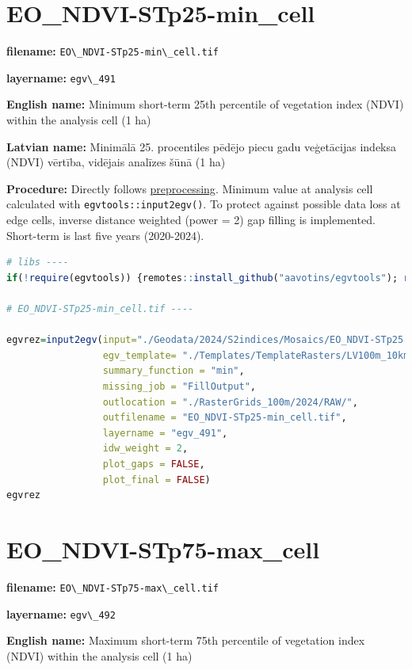 \documentclass[
]{book}
\newcommand{\passthrough}[1]{#1}
\begin{document}
\section{EO\_NDVI-STp25-min\_cell}\label{ch06.491}

\textbf{filename:} \passthrough{\lstinline!EO\_NDVI-STp25-min\_cell.tif!}

\textbf{layername:} \passthrough{\lstinline!egv\_491!}

\textbf{English name:} Minimum short-term 25th percentile of vegetation index (NDVI) within the analysis cell (1 ha)

\textbf{Latvian name:} Minimālā 25. procentiles pēdējo piecu gadu veģetācijas indeksa (NDVI) vērtība, vidējais analīzes šūnā (1 ha)

\textbf{Procedure:} Directly follows \hyperref[Ch04.13]{preprocessing}. Minimum value at analysis cell
calculated with \passthrough{\lstinline!egvtools::input2egv()!}. To protect against possible data loss at edge cells,
inverse distance weighted (power = 2) gap filling is implemented. Short-term is last five years (2020-2024).

\begin{lstlisting}[language=R]
# libs ----
if(!require(egvtools)) {remotes::install_github("aavotins/egvtools"); require(egvtools)}

# EO_NDVI-STp25-min_cell.tif ----

egvrez=input2egv(input="./Geodata/2024/S2indices/Mosaics/EO_NDVI-STp25.tif",
                 egv_template= "./Templates/TemplateRasters/LV100m_10km.tif",
                 summary_function = "min",
                 missing_job = "FillOutput",
                 outlocation = "./RasterGrids_100m/2024/RAW/",
                 outfilename = "EO_NDVI-STp25-min_cell.tif",
                 layername = "egv_491",
                 idw_weight = 2,
                 plot_gaps = FALSE,
                 plot_final = FALSE)
egvrez
\end{lstlisting}

\section{EO\_NDVI-STp75-max\_cell}\label{ch06.492}

\textbf{filename:} \passthrough{\lstinline!EO\_NDVI-STp75-max\_cell.tif!}

\textbf{layername:} \passthrough{\lstinline!egv\_492!}

\textbf{English name:} Maximum short-term 75th percentile of vegetation index (NDVI) within the analysis cell (1 ha)
\end{document}
